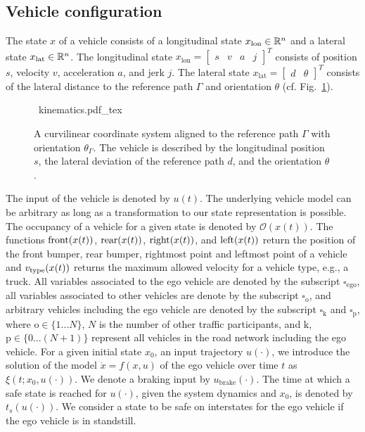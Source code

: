 \subsection{Vehicle configuration}
The state $x$ of a vehicle consists of a longitudinal state $x_\text{lon} \in \mathbb{R}^n$ and a lateral state  $x_\text{lat} \in \mathbb{R}^n$. The longitudinal state $x_\mathrm{lon} = \begin{bmatrix} s & v & a & j\end{bmatrix}^T$ consists of position $s$, velocity $v$, acceleration $a$, and jerk $j$.  
The lateral state $x_\mathrm{lat} = \begin{bmatrix} d & \theta \end{bmatrix}^T$ consists of the lateral distance to the reference path $\Gamma$ and orientation $\theta$ (cf. Fig.~\ref{fig:curvilinear_coordinate_system}). 
\begin{figure}[!tpb]
	\def\svgwidth{0.75\textwidth}
	\centering
	\mbox{\footnotesize
		{kinematics.pdf_tex}
	}
	\caption{
		A curvilinear coordinate system aligned to the reference path $\Gamma$ with orientation $\theta_\Gamma$. The vehicle is described by the longitudinal position $s$, the lateral deviation of the reference path $d$, and the orientation $\theta$.}
	\label{fig:curvilinear_coordinate_system}
\end{figure}
The input of the vehicle is denoted by $u(t)$. The underlying vehicle model can be arbitrary as long as a transformation to our state representation is possible. The occupancy of a vehicle for a given state is denoted by $\mathcal{O}(x(t))$. The functions  $\operatorname*{front}(x(t))$, $\operatorname*{rear}(x(t))$, $\operatorname*{right}(x(t))$, and $\operatorname*{left}(x(t))$ return the position of the front bumper, rear bumper, rightmost point and leftmost point of a vehicle and $v_\text{type}(x(t))$ returns the maximum allowed velocity for a vehicle type, e.g., a truck. All variables associated to the ego vehicle are denoted by the subscript $\square_\mathrm{ego}$, all variables associated to other vehicles are denote by the subscript $\square_\mathrm{o}$, and arbitrary vehicles including the ego vehicle are denoted by the subscript $\square_\mathrm{k}$ and $\square_\mathrm{p}$, where $\mathrm{o} \in \{1...N\}$, $N$ is the number of other traffic participants, and $\mathrm{k}$, $\mathrm{p} \in \{0...(N+1)\}$ represent all vehicles in the road network including the ego vehicle.
For a given initial state $x_0$, an input trajectory $u(\cdot)$, we introduce the solution of the model $\dot{x}=f(x,u)$ of the ego vehicle over time $t$ as $\xi(t;x_0,u(\cdot))$. 
We denote a braking input by $u_\mathrm{brake}(\cdot)$. The time at which a safe state is reached for $u(\cdot)$, given the system dynamics and $x_0$, is denoted by $t_s(u(\cdot))$. We consider a state to be safe on interstates for the ego vehicle if the ego vehicle is in standstill.


